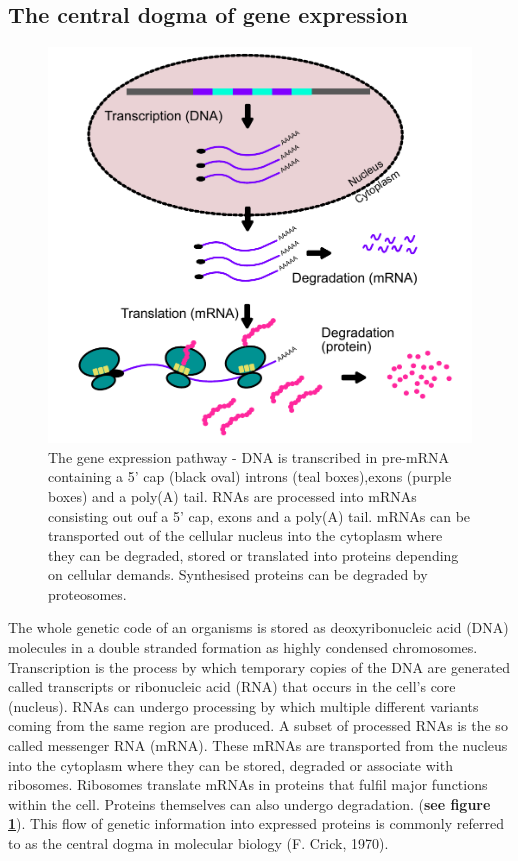 \documentclass[
  12pt,
  openany]{book}
\begin{document}
\subsection{The central dogma of gene expression}
  \begin{figure}
  \includegraphics{./figures/geneExprPath_2.pdf}
  \caption{The gene expression pathway - DNA is transcribed in pre-mRNA containing a 5' cap (black oval) introns (teal boxes),exons (purple boxes) and a poly(A) tail. RNAs are processed into mRNAs consisting out ouf a 5' cap, exons and a poly(A) tail. mRNAs can be transported out of the cellular nucleus into the cytoplasm where they can be degraded, stored or translated into proteins depending on cellular demands. Synthesised proteins can be degraded by proteosomes. \label{fig:geneExprPath}}
\end{figure}

The whole genetic code of an organisms is stored as deoxyribonucleic acid (DNA) molecules in a double stranded formation as highly condensed chromosomes. Transcription is the process by which temporary copies of the DNA are generated called transcripts or ribonucleic acid (RNA) that occurs in the cell's core (nucleus). RNAs can undergo processing by which multiple different variants coming from the same region are produced. A subset of processed RNAs is the so called messenger RNA (mRNA). These mRNAs are transported from the nucleus into the cytoplasm where they can be stored, degraded or associate with ribosomes. Ribosomes translate mRNAs in proteins that fulfil major functions within the cell. Proteins themselves can also undergo degradation. (\textbf{see figure \ref{fig:geneExprPath}}). This flow of genetic information into expressed proteins is commonly referred to as the central dogma in molecular biology (F. Crick, 1970).
\clearpage
\end{document}
